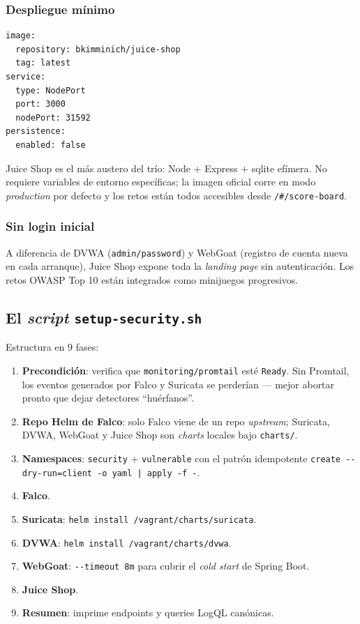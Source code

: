 \subsubsection{Despliegue mínimo}

\begin{lstlisting}[style=yaml]
image:
  repository: bkimminich/juice-shop
  tag: latest
service:
  type: NodePort
  port: 3000
  nodePort: 31592
persistence:
  enabled: false
\end{lstlisting}

Juice Shop es el más austero del trío: Node + Express + sqlite efímera. No requiere variables de entorno específicas; la imagen oficial corre en modo \emph{production} por defecto y los retos están todos accesibles desde \texttt{/\#/score-board}.

\subsubsection{Sin login inicial}

A diferencia de DVWA (\texttt{admin/password}) y WebGoat (registro de cuenta nueva en cada arranque), Juice Shop expone toda la \emph{landing page} sin autenticación. Los retos OWASP Top 10 están integrados como minijuegos progresivos.

\subsection{El \emph{script} \texttt{setup-security.sh}}

Estructura en 9 fases:

\begin{enumerate}
  \item \textbf{Precondición}: verifica que \texttt{monitoring/promtail} esté \texttt{Ready}. Sin Promtail, los eventos generados por Falco y Suricata se perderían --- mejor abortar pronto que dejar detectores ``huérfanos''.
  \item \textbf{Repo Helm de Falco}: solo Falco viene de un repo \emph{upstream}; Suricata, DVWA, WebGoat y Juice Shop son \emph{charts} locales bajo \texttt{charts/}.
  \item \textbf{Namespaces}: \texttt{security} + \texttt{vulnerable} con el patrón idempotente \texttt{create -{}-dry-run=client -o yaml | apply -f -}.
  \item \textbf{Falco}.
  \item \textbf{Suricata}: \texttt{helm install /vagrant/charts/suricata}.
  \item \textbf{DVWA}: \texttt{helm install /vagrant/charts/dvwa}.
  \item \textbf{WebGoat}: \texttt{-{}-timeout 8m} para cubrir el \emph{cold start} de Spring Boot.
  \item \textbf{Juice Shop}.
  \item \textbf{Resumen}: imprime endpoints y queries LogQL canónicas.
\end{enumerate}

